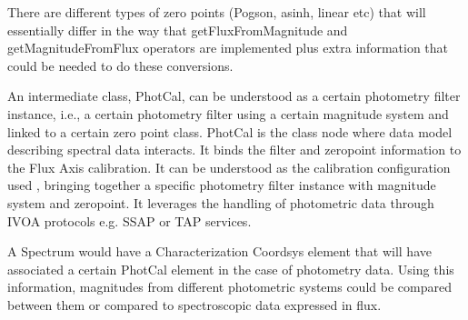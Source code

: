 \documentclass[11pt,a4paper]{ivoa}
\begin{document}
There are different types of zero points (Pogson, asinh, linear etc) that will 
essentially differ in the way that getFluxFromMagnitude and getMagnitudeFromFlux 
operators are implemented plus extra information that could be needed to do 
these conversions.
\par

An intermediate class, PhotCal, can be understood as a certain photometry 
filter instance, i.e., a certain photometry filter using a certain magnitude 
system and linked to a certain zero point class. PhotCal is the class node 
where data model describing spectral data interacts. It binds the filter and 
zeropoint information to the Flux Axis calibration. It can be understood as the 
calibration configuration used , bringing together a specific photometry filter 
instance with magnitude system and zeropoint. It leverages the handling of 
photometric data through IVOA protocols e.g. SSAP or TAP services.
\par

A Spectrum would have a Characterization Coordsys element that will have 
associated a certain PhotCal element in the case of photometry data. Using 
this information, magnitudes from different photometric systems could be 
compared between them or compared to spectroscopic data expressed in flux.
\par
\end{document}

